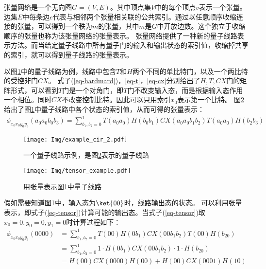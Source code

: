 张量网络是一个无向图\(G=\left(V,E\right)\)。其中顶点集$V$中的每个顶点$v$表示一个张量。边集\(E\)中每条边\(e\)代表与相邻两个张量相关联的公共索引。通过以任意顺序收缩连接的张量，可以得到一个秩为\(m\)的张量，其中\(m\)是$G$中开放边数。这个独立于收缩顺序的张量也称为该张量网络的张量表示\citep{biamonte2019lectures}。
张量网络提供了一种新的量子线路表示方法\citep{pednault2017breaking}。而当给定量子线路中所有量子门的输入和输出状态的索引值，收缩掉共享的索引，就可以得到量子线路的张量表示。
\begin{example}
    \label{ex-tensor}
    以图\ref{fig:example_cir_2}中的量子线路为例，线路中包含$T$和$H$两个不同的单比特门，以及一个两比特的受控非门$CX$。
式子(\ref{eq-hardmard})，\ref{eq-t}，\ref{eq-cx}分别给出了$H,T,CX$门的矩阵形式，可以看到$T$门是一个对角门，即$T$门不改变输入态，而是根据输入态作用一个相位。同时$CX$不改变控制比特。因此可以只用索引$x_0$表示第一个比特。
图\ref{fig:example_cir_map}给出了图\ref{fig:example_cir_2}中量子线路中各个状态的索引值，从而可得的张量表示：
\begin{align}
\label{eq-tensor}
\phi_{x_0x_0y_0y_3}\left(a_0a_0b_0b_3\right)=\sum_{b_1,b_2=0}^{1}T\left(a_0a_0\right)H\left(b_0b_1\right)CX\left(a_0a_0b_1b_2\right)T\left(a_0a_0\right)H\left(b_2b_3\right)
    \end{align}
\begin{figure}[!htbp]
    \centering
    \texttt{[image: Img/example\_cir\_2.pdf]}
    \caption{一个量子线路示例，是图\ref{fig:example_cir_map}表示的量子线路}   
    \label{fig:example_cir_2}
\end{figure}
\begin{figure}[!htbp]
    \centering
    \texttt{[image: Img/tensor\_example.pdf]}
    \caption{用张量表示图\ref{fig:example_cir_2}中量子线路}   
    \label{fig:example_cir_map}
\end{figure}
假如需要知道图\ref{fig:example_cir_2}中，输入态为\(\ket{00}\)时，线路输出态的状态。
可以利用张量表示，即式子(\ref{eq-tensor})计算可能的输出态。当式子(\ref{eq-tensor})取\(x_0 = 0, y_0 = 0, y_1 = 0\)时计算过程如下：
\begin{equation}
    \begin{aligned}
\phi_{x_0x_0y_0y_3}\left(0000\right)&=\sum_{b_1,b_2=0}^{1}T\left(00\right)H\left(0b_1\right)CX\left(00b_1b_2\right)T\left(00\right)H\left(b_20\right)\\ 
    &=\sum_{b_1,b_2=0}^{1}1\cdot H\left(0b_1\right)CX\left(00b_1b_2\right)\cdot 1\cdot H\left(b_20\right)\\
        &=H\left(00\right)CX\left(0000\right)H\left(00\right)+H\left(00\right)CX\left(0001\right)H\left(10\right)\\

\end{aligned}
\end{equation}
\end{example}
